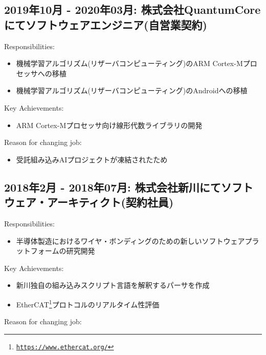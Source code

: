 \documentclass[letterpaper]{article}
\begin{document}
\subsection*{2019年10月 - 2020年03月: 株式会社QuantumCore にてソフトウェアエンジニア(自営業契約)}

\noindent Responsibilities:

\begin{itemize}
  \item 機械学習アルゴリズム(リザーバコンピューティング)のARM Cortex-Mプロセッサへの移植
  \item 機械学習アルゴリズム(リザーバコンピューティング)のAndroidへの移植
\end{itemize}

\noindent Key Achievements:

\begin{itemize}
  \item ARM Cortex-Mプロセッサ向け線形代数ライブラリの開発
\end{itemize}

\noindent Reason for changing job:

\begin{itemize}
  \item 受託組み込みAIプロジェクトが凍結されたため
\end{itemize}

\subsection*{2018年2月 - 2018年07月: 株式会社新川にてソフトウェア・アーキティクト(契約社員)}

\noindent Responsibilities:

\begin{itemize}
  \item 半導体製造におけるワイヤ・ボンディングのための新しいソフトウェアプラットフォームの研究開発
\end{itemize}

\noindent Key Achievements:

\begin{itemize}
  \item 新川独自の組み込みスクリプト言語を解釈するパーサを作成
  \item EtherCAT\footnote{\href{https://www.ethercat.org/}{\tt https://www.ethercat.org/}}プロトコルのリアルタイム性評価
\end{itemize}

\noindent Reason for changing job:
\end{document}
